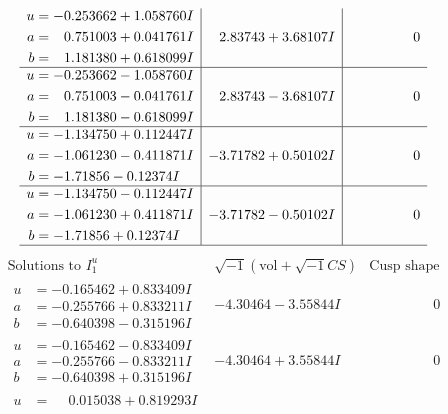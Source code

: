 \documentclass[1p]{elsarticle_modified}
\theoremstyle{definition}
\newcommand{\I}{\sqrt{-1}}
\begin{document}
$$\begin{array}{c|c|c}
\begin{aligned}
u &= -0.253662 + 1.058760 I \\
a &= \phantom{-}0.751003 + 0.041761 I \\
b &= \phantom{-}1.181380 + 0.618099 I\end{aligned}
 & \phantom{-}2.83743 + 3.68107 I & \phantom{-0.000000 } 0 \\ \hline\begin{aligned}
u &= -0.253662 - 1.058760 I \\
a &= \phantom{-}0.751003 - 0.041761 I \\
b &= \phantom{-}1.181380 - 0.618099 I\end{aligned}
 & \phantom{-}2.83743 - 3.68107 I & \phantom{-0.000000 } 0 \\ \hline\begin{aligned}
u &= -1.134750 + 0.112447 I \\
a &= -1.061230 - 0.411871 I \\
b &= -1.71856 - 0.12374 I\end{aligned}
 & -3.71782 + 0.50102 I & \phantom{-0.000000 } 0 \\ \hline\begin{aligned}
u &= -1.134750 - 0.112447 I \\
a &= -1.061230 + 0.411871 I \\
b &= -1.71856 + 0.12374 I\end{aligned}
 & -3.71782 - 0.50102 I & \phantom{-0.000000 } 0\\
 \hline 
 \end{array}$$\newpage$$\begin{array}{c|c|c}  
\text{Solutions to }I^u_{1}& \I (\text{vol} + \sqrt{-1}CS) & \text{Cusp shape}\\
 \hline 
\begin{aligned}
u &= -0.165462 + 0.833409 I \\
a &= -0.255766 + 0.833211 I \\
b &= -0.640398 - 0.315196 I\end{aligned}
 & -4.30464 - 3.55844 I & \phantom{-0.000000 } 0 \\ \hline\begin{aligned}
u &= -0.165462 - 0.833409 I \\
a &= -0.255766 - 0.833211 I \\
b &= -0.640398 + 0.315196 I\end{aligned}
 & -4.30464 + 3.55844 I & \phantom{-0.000000 } 0 \\ \hline\begin{aligned}
u &= \phantom{-}0.015038 + 0.819293 I \\

\end{aligned}
\end{array}$$
\end{document}
